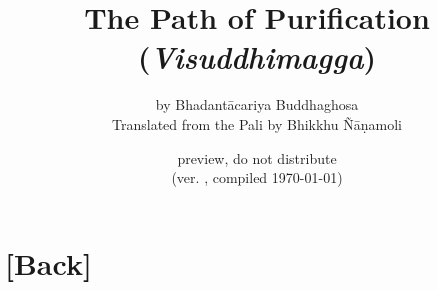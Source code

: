 \documentclass[a4paper]{book}
\def\vismCommitHref{\href{https://github.com/eudoxos/vism/commit/\vismCommit}{\vismCommit}}
\newif\ifplastex\plastexfalse
\def\frontmatter{\setcounter{part}{-1}\part{[Front]}} %
\def\backmatter{\setcounter{part}{-1}\part{[Back]}}
\let\origbackmatter\backmatter
\def\backmatter{\origbackmatter\pagestyle{vismNoBody}}
\begin{document}
	\title{The Path of Purification \\ (\emph{Visuddhimagga})}
	\date{preview, do not distribute \\ (ver. \vismCommitHref, compiled \today)}
	\ifplastex
		\author{by \\ Bhadantācariya Buddhaghosa \and Translated from the Pali by \\ Bhikkhu Ñāṇamoli}
	\else
		\author{by Bhadantācariya Buddhaghosa \\ Translated from the Pali by Bhikkhu Ñāṇamoli}
	\fi
	\maketitle

	\ifplastex\else\frontmatter\fi
		\tableofcontents
		\def\thesection{\arabic{section}}
		
	\backmatter
		
		
\end{document}
